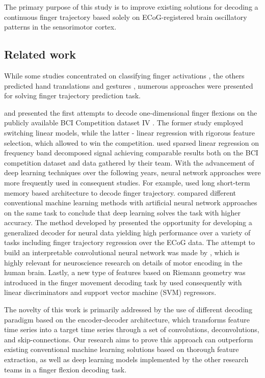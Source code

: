 \documentclass[letterpaper]{article} \usepackage{aaai22}  \usepackage{times}  \usepackage{helvet}  \usepackage{courier}  \usepackage[hyphens]{url}  \usepackage{graphicx} \urlstyle{rm} \def\UrlFont{\rm}  \usepackage{natbib}  \usepackage{caption} \DeclareCaptionStyle{ruled}{labelfont=normalfont,labelsep=colon,strut=off} \frenchspacing  \setlength{\pdfpagewidth}{8.5in}  \setlength{\pdfpageheight}{11in}  \usepackage{algorithm}
\begin{document}
The primary purpose of this study is to improve existing solutions for decoding a continuous finger trajectory based solely on ECoG-registered brain oscillatory patterns in the sensorimotor cortex. 

\subsection*{Related work}


While some studies concentrated on classifying finger activations \citep{hotson2016, onaran2011, yao2019}, the others predicted hand translations \citep{pistohl2008, nakanishi2013, bundy2016, sliwowski2022} and gestures \citep{pan2018, branco2017}, numerous approaches were presented for solving finger trajectory prediction task. 

\citet{liang2012} and \citet{flamary2012} presented the first attempts to decode one-dimensional finger flexions on the publicly available BCI Competition dataset IV \citep{schalk2007}. The former study employed switching linear models, while the latter - linear regression with rigorous feature selection, which allowed to win the competition. \citet{nakanishi2014} used sparsed linear regression on frequency band decomposed signal achieving comparable results both on the BCI competition dataset and data gathered by their team. With the advancement of deep learning \citep{lecun2015} techniques over the following years, neural network approaches were more frequently used in consequent studies. For example, \citet{xie2018} used long short-term memory based \citep{hochreiter1997} architecture to decode finger trajectory. \citet{jubien2019} compared different conventional machine learning methods with artificial neural network approaches on the same task to conclude that deep learning solves the task with higher accuracy. The method developed by \citet{frey2021} presented the opportunity for developing a generalized decoder for neural data yielding high performance over a variety of tasks including finger trajectory regression over the ECoG data. The attempt to build an interpretable convolutional neural network was made by \citet{petrosyan2021}, which is highly relevant for neuroscience research on details of motor encoding in the human brain. Lastly, a new type of features based on Riemann geometry \citep{congedo2017} was introduced in the finger movement decoding task by \citet{yao2022} used consequently with linear discriminators and support vector machine (SVM) regressors. 

The novelty of this work is primarily addressed by the use of different decoding paradigm based on the encoder-decoder architecture, which transforms feature time series into a target time series through a set of convolutions, deconvolutions, and skip-connections. Our research aims to prove this approach can outperform existing conventional machine learning solutions based on thorough feature extraction, as well as deep learning models implemented by the other research teams in a finger flexion decoding task.
\end{document}
